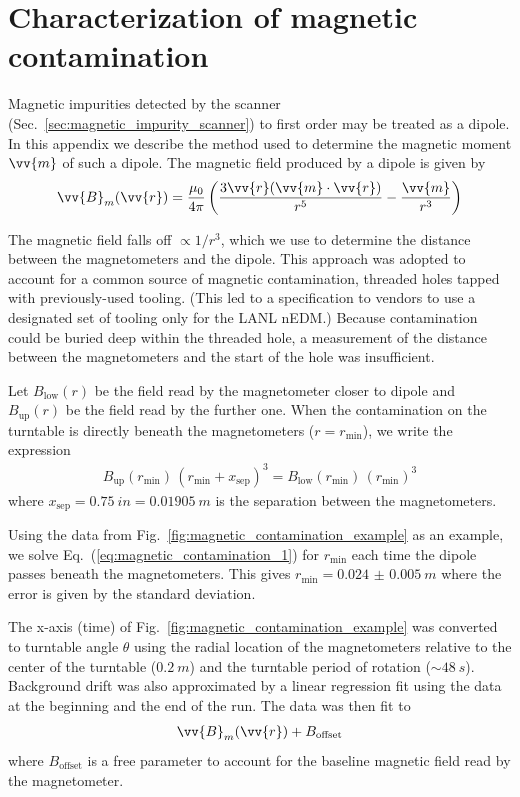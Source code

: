 
\chapter{Characterization of magnetic contamination}\label{appx:magnetic_contamination}


Magnetic impurities detected by the scanner (Sec.~\ref{sec:magnetic_impurity_scanner}) to first order may be treated as a dipole. In this appendix we describe the method used to determine the magnetic moment $\vv{m}$ of such a dipole. The magnetic field produced by a dipole is given by \cite{chow2006introduction}
%
\begin{gather}
    \vv{B}_m({\vv{r}}) = \frac{\mu_{0}}{4\pi}\left(\frac{3\vv{r}(\vv{m}\cdot\vv{r})}{r^{5}} - \frac{{\vv{m}}}{r^{3}}\right)
\end{gather}

The magnetic field falls off $\propto 1/r^3$, which we use to determine the distance between the magnetometers and the dipole. This approach was adopted to account for a common source of magnetic contamination, threaded holes tapped with previously-used tooling. (This led to a specification to vendors to use a designated set of tooling only for the LANL nEDM.) Because contamination could be buried deep within the threaded hole, a measurement of the distance between the magnetometers and the start of the hole was insufficient.

Let $B_\text{low}(r)$ be the field read by the magnetometer closer to dipole and $B_\text{up}(r)$ be the field read by the further one. When the contamination on the turntable is directly beneath the magnetometers ($r=r_\text{min}$), we write the expression
%
\begin{gather}
    B_\text{up}(r_\text{min})\,(r_\text{min} + x_\text{sep})^3 = B_\text{low}(r_\text{min})\,(r_\text{min})^3 \label{eq:magnetic_contamination_1}
\end{gather}
%
where $x_\text{sep}=\qty{0.75}{in}=\qty{0.01905}{m}$ is the separation between the magnetometers.

Using the data from Fig.~\ref{fig:magnetic_contamination_example} as an example, we solve Eq.~(\ref{eq:magnetic_contamination_1}) for $r_\text{min}$ each time the dipole passes beneath the magnetometers. This gives $r_\text{min}=\qty{0.024(5)}{m}$ where the error is given by the standard deviation.

The x-axis (time) of Fig.~\ref{fig:magnetic_contamination_example} was converted to turntable angle $\theta$ using the radial location of the magnetometers relative to the center of the turntable ($\qty{0.2}{m}$) and the turntable period of rotation ($\sim\qty{48}{s}$). Background drift was also approximated by a linear regression fit using the data at the beginning and the end of the run. The data was then fit to
%
\begin{gather}
    \vv{B}_m({\vv{r}}) + B_\text{offset}\label{eq:dipole_fitting}
\end{gather}
%
where $B_\text{offset}$ is a free parameter to account for the baseline magnetic field read by the magnetometer.


